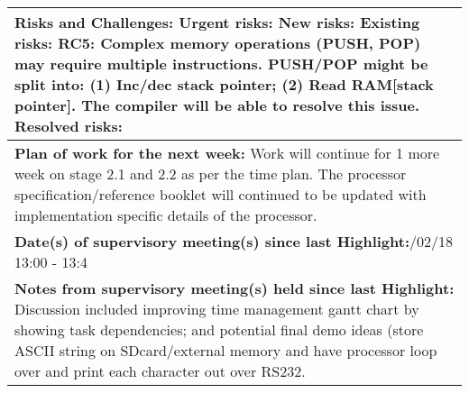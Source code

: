 \begin{table}[H]
\begin{tabularx}{\textwidth}{|X|}
	\\ \hline
	\textbf{Risks and Challenges:}\newline
	{\color{red} Urgent risks:}\newline
	{\color{orange} New risks:}\newline
	{\color{purple} Existing risks:\newline
	RC5: Complex memory operations (PUSH, POP) may require multiple instructions. PUSH/POP might be split into: (1) Inc/dec stack pointer; (2) Read RAM[stack pointer]. The compiler will be able to resolve this issue.}\newline
	{\color{gray} Resolved risks:}
	\\ \hline
	\textbf{Plan of work for the next week:}\newline
	Work will continue for 1 more week on stage 2.1 and 2.2 as per the time plan.
	\newline
	The processor specification/reference booklet will continued to be updated with implementation specific details of the processor.
	\\ \hline
	\textbf{Date(s) of supervisory meeting(s) since last Highlight:}\newline
	21/02/18 13:00 - 13:4
	\\ \hline
	\textbf{Notes from supervisory meeting(s) held since last Highlight:}\newline
	Discussion included improving time management gantt chart by showing task dependencies; and potential final demo ideas (store ASCII string on SDcard/external memory and have processor loop over and print each character out over RS232.
	\\ \hline
    \end{tabularx}
\end{table}

\newpage
